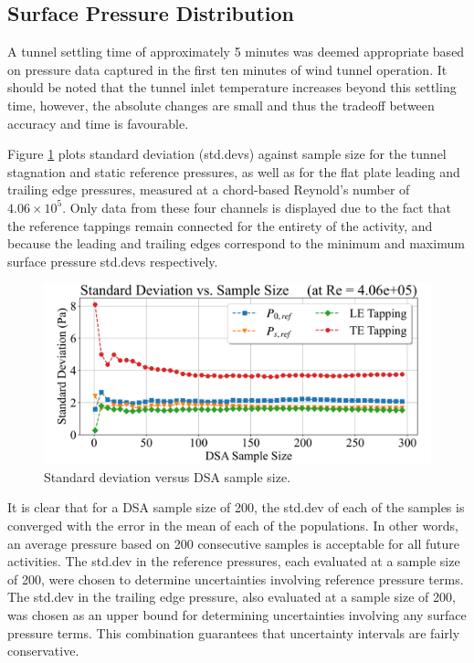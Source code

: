 \documentclass[11pt,a4paper,twocolumn]{article}
\begin{document}
\subsection{Surface Pressure Distribution}
A tunnel settling time of approximately 5 minutes was deemed appropriate based on pressure data captured in the first ten minutes of wind tunnel operation. It should be noted that the tunnel inlet temperature increases beyond this settling time, however, the absolute changes are small and thus the tradeoff between accuracy and time is favourable. 

Figure \ref{exp_1_fig2} plots standard deviation (std.devs) against sample size for the tunnel stagnation and static reference pressures, as well as for the flat plate leading and trailing edge pressures, measured at a chord-based Reynold’s number of $4.06\times 10^5$. Only data from these four channels is displayed due to the fact that the reference tappings remain connected for the entirety of the activity, and because the leading and trailing edges correspond to the minimum and maximum surface pressure std.devs respectively.

\begin{figure}[!ht]
{\centering
\includegraphics[width = \columnwidth]{exp_1_standard_deviation_pressure.png}
\caption{Standard deviation versus DSA sample size.}
\label{exp_1_fig2}}
\end{figure}

It is clear that for a DSA sample size of 200, the std.dev of each of the samples is converged with the error in the mean of each of the populations. In other words, an average pressure based on 200 consecutive samples is acceptable for all future activities. The std.dev in the reference pressures, each evaluated at a sample size of 200, were chosen to determine uncertainties involving reference pressure terms. The std.dev in the trailing edge pressure, also evaluated at a sample size of 200, was chosen as an upper bound for determining uncertainties involving any surface pressure terms. This combination guarantees that uncertainty intervals are fairly conservative. 
\end{document}
